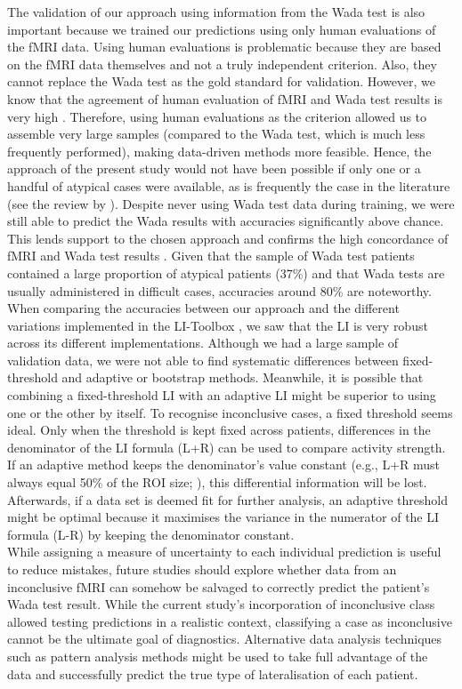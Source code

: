 \documentclass[fleqn,10pt]{SelfArx} %
\begin{document}
The validation of our approach using information from the Wada test is also important because we trained our predictions using only human evaluations of the fMRI data. Using human evaluations is problematic because they are based on the fMRI data themselves and not a truly independent criterion. Also, they cannot replace the Wada test as the gold standard for validation. However, we know that the agreement of human evaluation of fMRI and Wada test results is very high \citep{Woermann_2003}. Therefore, using human evaluations as the criterion allowed us to assemble very large samples (compared to the Wada test, which is much less frequently performed), making data-driven methods more feasible. Hence, the approach of the present study would not have been possible if only one or a handful of atypical cases were available, as is frequently the case in the literature (see the review by \citealt{Dym_2011}). Despite never using Wada test data during training, we were still able to predict the Wada results with accuracies significantly above chance. This lends support to the chosen approach and confirms the high concordance of fMRI and Wada test results \citep{Binder_2011, Szaflarski_2017}. Given that the sample of Wada test patients contained a large proportion of atypical patients (37\%) and that Wada tests are usually administered in difficult cases, accuracies around 80\% are noteworthy.\\
When comparing the accuracies between our approach and the different variations implemented in the LI-Toolbox \citep{Wilke_2007}, we saw that the LI is very robust across its different implementations. Although we had a large sample of validation data, we were not able to find systematic differences between fixed-threshold and adaptive or bootstrap methods. Meanwhile, it is possible that combining a fixed-threshold LI with an adaptive LI might be superior to using one or the other by itself. To recognise inconclusive cases, a fixed threshold seems ideal. Only when the threshold is kept fixed across patients, differences in the denominator of the LI formula (L+R) can be used to compare activity strength. If an adaptive method keeps the denominator’s value constant (e.g., L+R must always equal 50\% of the ROI size; \citealt{Wilke_2007}), this differential information will be lost. Afterwards, if a data set is deemed fit for further analysis, an adaptive threshold might be optimal because it maximises the variance in the numerator of the LI formula (L-R) by keeping the denominator constant.\\
While assigning a measure of uncertainty to each individual prediction is useful to reduce mistakes, future studies should explore whether data from an inconclusive fMRI can somehow be salvaged to correctly predict the patient’s Wada test result. While the current study’s incorporation of inconclusive class allowed testing predictions in a realistic context, classifying a case as inconclusive cannot be the ultimate goal of diagnostics. Alternative data analysis techniques such as pattern analysis methods \citep{Zago_2017} might be used to take full advantage of the data and successfully predict the true type of lateralisation of each patient.\\
\end{document}
